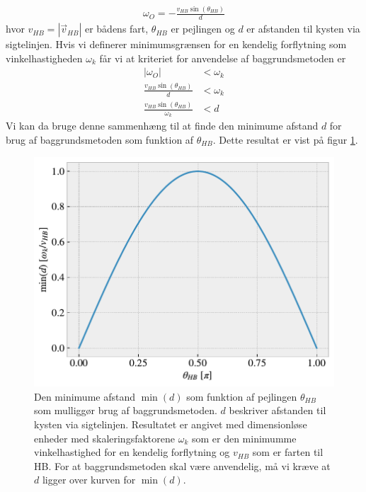 \documentclass[%
 reprint,
nofootinbib,
aps,
]{revtex4-1}
\begin{document}
 \begin{align*}
   \omega_O = -\frac{v_{HB}\sin{(\theta_{HB})}}{d}
 \end{align*}
 hvor $v_{HB} = |\vec{v}_{HB}|$ er bådens fart, $\theta_{HB}$ er pejlingen og $d$ er afstanden til kysten via sigtelinjen. Hvis vi definerer minimumsgrænsen for en kendelig forflytning som vinkelhastigheden $\omega_k$ får vi at kriteriet for anvendelse af baggrundsmetoden er
 \begin{align}
   |\omega_O| &< \omega_k \nonumber \\
   \frac{v_{HB}\sin{(\theta_{HB})}}{d} &< \omega_k \nonumber \\
   \frac{v_{HB}\sin{(\theta_{HB})}}{\omega_k} &< d
   \label{eq:limit}
 \end{align}
Vi kan da bruge denne sammenhæng til at finde den minimume afstand $d$ for brug af baggrundsmetoden som funktion af $\theta_{HB}$. Dette resultat er vist på figur \ref{fig:limit_dimensionless}.
 \begin{figure}[H]
   \includegraphics[width=\linewidth]{figures/limit_dimensionless.pdf}
   \caption{Den minimume afstand $\min{(d)}$ som funktion af pejlingen $\theta_{HB}$ som mulliggør brug af baggrundsmetoden. $d$ beskriver afstanden til kysten via sigtelinjen. Resultatet er angivet med dimensionløse enheder med skaleringsfaktorene $\omega_k$ som er den minimumme vinkelhastighed for en kendelig forflytning og $v_{HB}$ som er farten til HB. For at baggrundsmetoden skal være anvendelig, må vi kræve at $d$ ligger over kurven for $\min{(d)}$.}
   \label{fig:limit_dimensionless}
 \end{figure}
\end{document}
